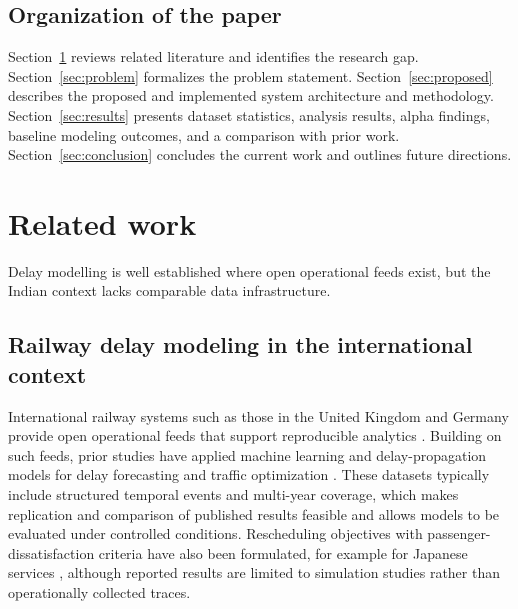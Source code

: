 \documentclass[a4paper,fleqn]{cas-dc}
\begin{document}
\subsection{Organization of the paper}
Section~\ref{sec:related} reviews related literature and identifies the
research gap. Section~\ref{sec:problem} formalizes the problem statement.
Section~\ref{sec:proposed} describes the proposed and implemented system
architecture and methodology. Section~\ref{sec:results} presents dataset
statistics, analysis results, alpha findings, baseline modeling outcomes,
and a comparison with prior work. Section~\ref{sec:conclusion} concludes the
current work and outlines future directions.

\section{Related work}
\label{sec:related}

Delay modelling is well established where open operational feeds exist, but
the Indian context lacks comparable data infrastructure.

\subsection{Railway delay modeling in the international context}
International railway systems such as those in the United Kingdom and
Germany provide open operational feeds that support reproducible analytics
\citep{uk_rail_data,german_rail_data}. Building on such feeds, prior studies
have applied machine learning and delay-propagation models for delay
forecasting and traffic optimization
\citep{oneto2018train,flier2009delay,goverde2010railway}. These datasets
typically include structured temporal events and multi-year coverage, which
makes replication and comparison of published results feasible and allows
models to be evaluated under controlled conditions. Rescheduling objectives with
passenger-dissatisfaction criteria have also been formulated, for example for
Japanese services \citep{tomii2005train}, although reported results are limited to
simulation studies rather than operationally collected traces.
\end{document}
